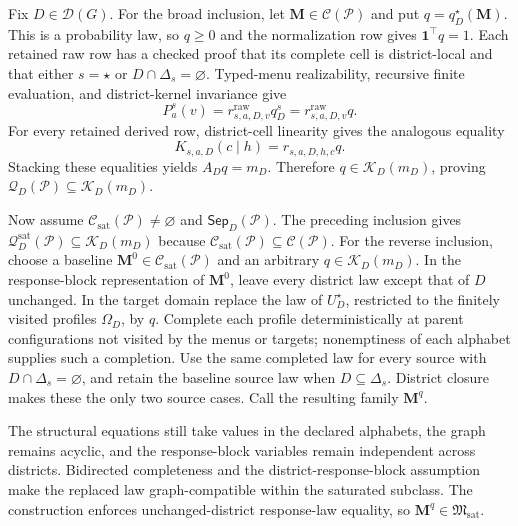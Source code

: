 Fix \(D\in\mathcal D(G)\).  For the broad inclusion, let \(\mathbf M\in\mathcal C(\mathcal P)\) and put \(q=q_D^\star(\mathbf M)\).  This is a probability law, so \(q\geq0\) and the normalization row gives \(\mathbf 1^\top q=1\).  Each retained raw row has a checked proof that its complete cell is district-local and that either \(s=\star\) or \(D\cap\Delta_s=\varnothing\).  Typed-menu realizability, recursive finite evaluation, and district-kernel invariance give
\[
P_a^s(v)=r^{\mathrm{raw}}_{s,a,D,v}q_D^s
=r^{\mathrm{raw}}_{s,a,D,v}q.
\]
For every retained derived row, district-cell linearity gives the analogous equality
\[
K_{s,a,D}(c\mid h)=r_{s,a,D,h,c}q.
\]
Stacking these equalities yields \(A_Dq=m_D\).  Therefore \(q\in\mathcal K_D(m_D)\), proving
\(
\mathcal Q_D(\mathcal P)\subseteq\mathcal K_D(m_D)
\).

Now assume \(\mathcal C_{\mathrm{sat}}(\mathcal P)\ne\varnothing\) and \(\mathsf{Sep}_D(\mathcal P)\).  The preceding inclusion gives
\(
\mathcal Q_D^{\mathrm{sat}}(\mathcal P)\subseteq\mathcal K_D(m_D)
\)
because \(\mathcal C_{\mathrm{sat}}(\mathcal P)\subseteq\mathcal C(\mathcal P)\).  For the reverse inclusion, choose a baseline \(\mathbf M^0\in\mathcal C_{\mathrm{sat}}(\mathcal P)\) and an arbitrary \(q\in\mathcal K_D(m_D)\).  In the response-block representation of \(\mathbf M^0\), leave every district law except that of \(D\) unchanged.  In the target domain replace the law of \(U_D^\star\), restricted to the finitely visited profiles \(\Omega_D\), by \(q\).  Complete each profile deterministically at parent configurations not visited by the menus or targets; nonemptiness of each alphabet supplies such a completion.  Use the same completed law for every source with \(D\cap\Delta_s=\varnothing\), and retain the baseline source law when \(D\subseteq\Delta_s\).  District closure makes these the only two source cases.  Call the resulting family \(\mathbf M^q\).

The structural equations still take values in the declared alphabets, the graph remains acyclic, and the response-block variables remain independent across districts.  Bidirected completeness and the district-response-block assumption make the replaced law graph-compatible within the saturated subclass.  The construction enforces unchanged-district response-law equality, so \(\mathbf M^q\in\mathfrak M_{\mathrm{sat}}\).

